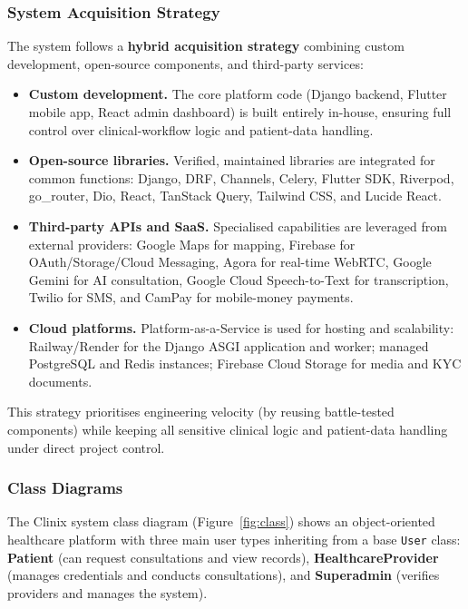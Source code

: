 \subsubsection*{System Acquisition Strategy}

The system follows a \textbf{hybrid acquisition strategy} combining custom development, open-source components, and third-party services:

\begin{itemize}
  \item \textbf{Custom development.} The core platform code (Django backend, Flutter mobile app, React admin dashboard) is built entirely in-house, ensuring full control over clinical-workflow logic and patient-data handling.
  \item \textbf{Open-source libraries.} Verified, maintained libraries are integrated for common functions: Django, DRF, Channels, Celery, Flutter SDK, Riverpod, go\_router, Dio, React, TanStack Query, Tailwind CSS, and Lucide React.
  \item \textbf{Third-party APIs and SaaS.} Specialised capabilities are leveraged from external providers: Google Maps for mapping, Firebase for OAuth/Storage/Cloud Messaging, Agora for real-time WebRTC, Google Gemini for AI consultation, Google Cloud Speech-to-Text for transcription, Twilio for SMS, and CamPay for mobile-money payments.
  \item \textbf{Cloud platforms.} Platform-as-a-Service is used for hosting and scalability: Railway/Render for the Django ASGI application and worker; managed PostgreSQL and Redis instances; Firebase Cloud Storage for media and KYC documents.
\end{itemize}

This strategy prioritises engineering velocity (by reusing battle-tested components) while keeping all sensitive clinical logic and patient-data handling under direct project control.

\subsubsection*{Class Diagrams}

The Clinix system class diagram (Figure~\ref{fig:class}) shows an object-oriented healthcare platform with three main user types inheriting from a base \texttt{User} class: \textbf{Patient} (can request consultations and view records), \textbf{HealthcareProvider} (manages credentials and conducts consultations), and \textbf{Superadmin} (verifies providers and manages the system).

